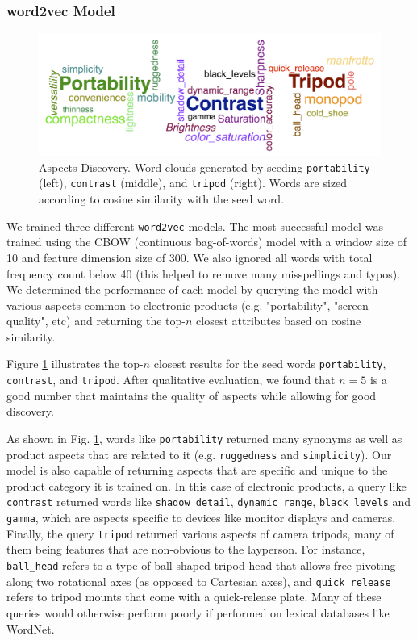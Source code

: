 \documentclass{article} %
\begin{document}
\subsubsection{word2vec Model}
\begin{figure}[ht]
\begin{center}
\includegraphics[width=\columnwidth]{Aspects_long.png}
\end{center}
\caption{Aspects Discovery. Word clouds generated by seeding \texttt{portability} (left), \texttt{contrast} (middle), and \texttt{tripod} (right). Words are sized according to cosine similarity with the seed word.}
\label{aspectFig}
\end{figure}

We trained three different \texttt{word2vec} models. The most successful model was trained using the CBOW (continuous bag-of-words) model with a window size of 10 and feature dimension size of 300. We also ignored all words with total frequency count below 40 (this helped to remove many misspellings and typos). We determined the performance of each model by querying the model with various aspects common to electronic products (e.g. "portability", "screen quality", etc) and returning the top-$n$ closest attributes based on cosine similarity.

Figure \ref{aspectFig} illustrates the top-$n$ closest results for the seed words \texttt{portability}, \texttt{contrast}, and \texttt{tripod}. After qualitative evaluation, we found that $n=5$ is a good number that maintains the quality of aspects while allowing for good discovery.

As shown in Fig. \ref{aspectFig}, words like \texttt{portability} returned many synonyms as well as product aspects that are related to it (e.g. \texttt{ruggedness} and \texttt{simplicity}). Our model is also capable of returning aspects that are specific and unique to the product category it is trained on. In this case of electronic products, a query like \texttt{contrast} returned words like \texttt{shadow\_detail}, \texttt{dynamic\_range}, \texttt{black\_levels} and \texttt{gamma}, which are aspects specific to devices like monitor displays and cameras. Finally, the query \texttt{tripod} returned various aspects of camera tripods, many of them being features that are non-obvious to the layperson. For instance, \texttt{ball\_head} refers to a type of ball-shaped tripod head that allows free-pivoting along two rotational axes (as opposed to Cartesian axes), and \texttt{quick\_release} refers to tripod mounts that come with a quick-release plate. Many of these queries would otherwise perform poorly if performed on lexical databases like WordNet.
\end{document}

